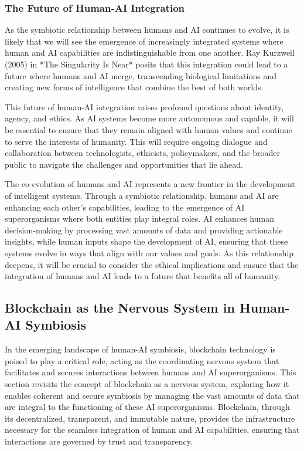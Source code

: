 \documentclass[12pt,twoside]{article}
\begin{document}
\subsubsection{The Future of Human-AI Integration}

As the symbiotic relationship between humans and AI continues to evolve, it is likely that we will see the emergence of increasingly integrated systems where human and AI capabilities are indistinguishable from one another. Ray Kurzweil (2005) in *The Singularity Is Near* posits that this integration could lead to a future where humans and AI merge, transcending biological limitations and creating new forms of intelligence that combine the best of both worlds.

This future of human-AI integration raises profound questions about identity, agency, and ethics. As AI systems become more autonomous and capable, it will be essential to ensure that they remain aligned with human values and continue to serve the interests of humanity. This will require ongoing dialogue and collaboration between technologists, ethicists, policymakers, and the broader public to navigate the challenges and opportunities that lie ahead.

The co-evolution of humans and AI represents a new frontier in the development of intelligent systems. Through a symbiotic relationship, humans and AI are enhancing each other’s capabilities, leading to the emergence of AI superorganisms where both entities play integral roles. AI enhances human decision-making by processing vast amounts of data and providing actionable insights, while human inputs shape the development of AI, ensuring that these systems evolve in ways that align with our values and goals. As this relationship deepens, it will be crucial to consider the ethical implications and ensure that the integration of humans and AI leads to a future that benefits all of humanity.

\subsection{Blockchain as the Nervous System in Human-AI Symbiosis}

In the emerging landscape of human-AI symbiosis, blockchain technology is poised to play a critical role, acting as the coordinating nervous system that facilitates and secures interactions between humans and AI superorganisms. This section revisits the concept of blockchain as a nervous system, exploring how it enables coherent and secure symbiosis by managing the vast amounts of data that are integral to the functioning of these AI superorganisms. Blockchain, through its decentralized, transparent, and immutable nature, provides the infrastructure necessary for the seamless integration of human and AI capabilities, ensuring that interactions are governed by trust and transparency.
\end{document}
